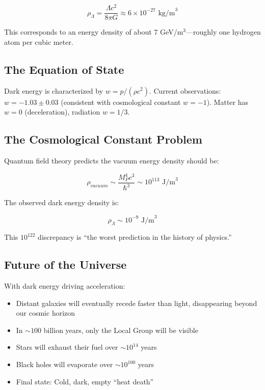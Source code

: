 \documentclass[11pt,a4paper]{article}
\begin{document}
\begin{equationbox}
\begin{equation}
\rho_\Lambda = \frac{\Lambda c^2}{8\pi G} \approx 6 \times 10^{-27} \text{ kg/m}^3
\label{eq:rho_lambda}
\end{equation}
\end{equationbox}

This corresponds to an energy density of about 7 GeV/m$^3$---roughly one hydrogen atom per cubic meter.

\subsection{The Equation of State}

Dark energy is characterized by $w = p/(\rho c^2)$. Current observations: $w = -1.03 \pm 0.03$ (consistent with cosmological constant $w = -1$). Matter has $w = 0$ (deceleration), radiation $w = 1/3$.

\subsection{The Cosmological Constant Problem}

Quantum field theory predicts the vacuum energy density should be:

\begin{equation}
\rho_{vacuum} \sim \frac{M_P^4 c^3}{\hbar^3} \sim 10^{113} \text{ J/m}^3
\end{equation}

The observed dark energy density is:

\begin{equation}
\rho_\Lambda \sim 10^{-9} \text{ J/m}^3
\end{equation}

This $10^{122}$ discrepancy is ``the worst prediction in the history of physics.''

\subsection{Future of the Universe}

With dark energy driving acceleration:

\begin{itemize}[noitemsep]
    \item Distant galaxies will eventually recede faster than light, disappearing beyond our cosmic horizon
    \item In $\sim 100$ billion years, only the Local Group will be visible
    \item Stars will exhaust their fuel over $\sim 10^{14}$ years
    \item Black holes will evaporate over $\sim 10^{100}$ years
    \item Final state: Cold, dark, empty ``heat death''
\end{itemize}
\end{document}
